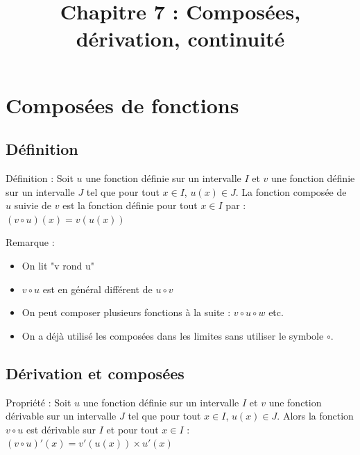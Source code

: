 \documentclass[11pt,a4paper]{article}
\begin{document}
\title{\textbf{Chapitre 7 : Composées, dérivation, continuité}}
\date{}
\maketitle

\section{Composées de fonctions}

\subsection{Définition}

\begin{boiteDef}{Définition :}
    Soit $u$ une fonction définie sur un intervalle $I$ et $v$ une fonction définie sur un intervalle $J$ tel que pour tout $x \in I$, $u(x) \in J$. La fonction composée de $u$ suivie de $v$ est la fonction définie pour tout $x \in I$ par :
    \newline
    $(v \circ u)(x) = v(u(x))$
\end{boiteDef}

\begin{boiteRemarque}{Remarque :}
    \begin{itemize}
        \item On lit "v rond u"
        \item $v \circ u$ est en général différent de $u \circ v$
        \item On peut composer plusieurs fonctions à la suite : $v \circ u \circ w$ etc.
        \item On a déjà utilisé les composées dans les limites sans utiliser le symbole $\circ$.
    \end{itemize}
\end{boiteRemarque}

\subsection{Dérivation et composées}

\begin{boiteProp}{Propriété :}
    Soit $u$ une fonction définie sur un intervalle $I$ et $v$ une fonction dérivable sur un intervalle $J$ tel que pour tout $x \in I$, $u(x) \in J$. 
    \newline
    Alors la fonction $v \circ u$ est dérivable sur $I$ et pour tout $x \in I$ :
    \newline
    $(v \circ u)'(x) = v'(u(x)) \times u'(x)$
\end{boiteProp}
\end{document}
